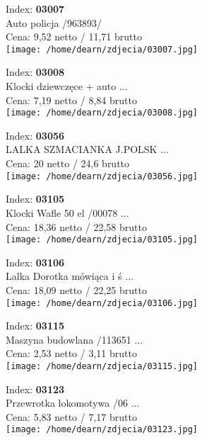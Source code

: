 {Index: \textbf{03007}\\
Auto policja /963893/\\
Cena: 9,52 netto / 11,71 brutto\\
  \texttt{[image: /home/dearn/zdjecia/03007.jpg]}}\newline\newline

{Index: \textbf{03008}\\
Klocki dziewczęce + auto  ...\\
Cena: 7,19 netto / 8,84 brutto\\
  \texttt{[image: /home/dearn/zdjecia/03008.jpg]}}\newline\newline

{Index: \textbf{03056}\\
LALKA SZMACIANKA  J.POLSK ...\\
Cena: 20 netto / 24,6 brutto\\
  \texttt{[image: /home/dearn/zdjecia/03056.jpg]}}\newline\newline

{Index: \textbf{03105}\\
Klocki Wafle 50 el /00078 ...\\
Cena: 18,36 netto / 22,58 brutto\\
  \texttt{[image: /home/dearn/zdjecia/03105.jpg]}}\newline\newline

{Index: \textbf{03106}\\
Lalka Dorotka mówiąca i ś ...\\
Cena: 18,09 netto / 22,25 brutto\\
  \texttt{[image: /home/dearn/zdjecia/03106.jpg]}}\newline\newline

{Index: \textbf{03115}\\
Maszyna budowlana /113651 ...\\
Cena: 2,53 netto / 3,11 brutto\\
  \texttt{[image: /home/dearn/zdjecia/03115.jpg]}}\newline\newline

{Index: \textbf{03123}\\
Przewrotka lokomotywa /06 ...\\
Cena: 5,83 netto / 7,17 brutto\\
  \texttt{[image: /home/dearn/zdjecia/03123.jpg]}}\newline\newline

